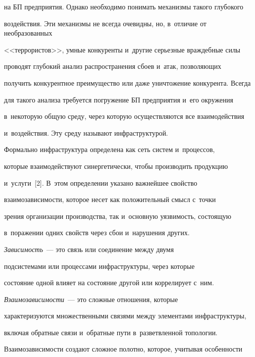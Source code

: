 на БП предприятия. Однако необходимо понимать механизмы такого глубокого 


воздействия. Эти механизмы не всегда очевидны, но, в~отличие от необразованных 


<<террористов>>, умные конкуренты и~другие серьезные враж\-деб\-ные силы 


проводят глубокий анализ рас\-про\-стра\-не\-ния сбоев и~атак, поз\-во\-ля\-ющих 


получить конкурентное преимущество или даже уничтожение конкурента. Всегда 


для такого анализа требуется погружение БП предприятия и~его окружения 


в~некоторую общую среду, через которую осуществляются все взаимодействия 


и~воздействия. Эту среду называют инфраструктурой.


  


  Формально инфраструктура определена как сеть сис\-тем и~процессов, 


которые взаимодействуют синергетически, чтобы производить продукцию 


и~услуги~[2]. В~этом определении указано важ\-ней\-шее свойство  


вза\-и\-мо\-за\-ви\-си\-мости, которое несет как положительный смысл с~точ\-ки 


зрения организации производства, так и~основную уяз\-ви\-мость, со\-сто\-ящую 


в~поражении одних свойств через сбои и~нарушения других. 


  


  \textit{Зависимость}~--- это связь или соединение между двумя  


под\-сис\-те\-ма\-ми или процессами инфраструктуры, через которые  


со\-сто\-яние одной влияет на со\-сто\-яние другой или коррелирует с~ним. 


  


  \textit{Взаимозависимости}~--- это сложные отношения, которые 


характеризуются множественными связями меж\-ду элементами инфраструктуры, 


включая обратные связи и~обрат\-ные пути в~разветвленной топологии. 


Взаимозависимости создают слож\-ное полотно, которое, учитывая особенности 


